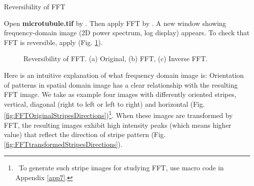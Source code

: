 \begin{indentexercise}{1}
Reversibility of FFT

Open \textbf{microtubule.tif} by . Then apply FFT by . A new window showing frequency-domain image (2D power spectrum, log display) appears. To check that FFT is reversible, apply  (Fig. \ref{fig:FFTreversibility}).

\end{indentexercise}

\begin{figure}[htbp]
 \centering
 \caption{ Reversibility of FFT. (a) Original, (b) FFT, (c) Inverse FFT.}
 \label{fig:FFTreversibility}
\end{figure} 

Here is an intuitive explanation of what frequency domain image is:
Orientation of patterns in spatial domain image has a clear
relationship with the resulting FFT image. We take as example four images
with differently oriented stripes, vertical, diagonal (right to left or
left to right) and horizontal (Fig. \ref{fig:FFTOriginalStripesDirections})\footnote{\ To generate such stripe images for studying FFT, use macro code in Appendix \ref{app7}. }. When
these images are transformed by FFT, the resulting images exhibit high
intensity peaks (which means higher value) that reflect the direction 
of stripe pattern (Fig. \ref{fig:FFTtransformedStripesDirections}). 

